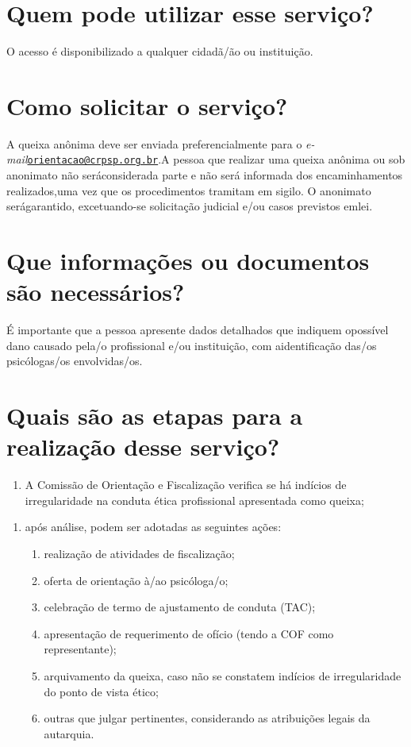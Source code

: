 \section{Quem pode utilizar esse serviço?}

O acesso é disponibilizado a qualquer cidadã/ão ou instituição.

\section{Como solicitar o serviço?}

A queixa anônima deve ser enviada preferencialmente para o \emph{e-mail}\href{mailto:orientacao@crpsp.org.br}{\nolinkurl{orientacao@crpsp.org.br}}.A pessoa que realizar uma queixa anônima ou sob anonimato não seráconsiderada parte e não será informada dos encaminhamentos realizados,uma vez que os procedimentos tramitam em sigilo. O anonimato serágarantido, excetuando-se solicitação judicial e/ou casos previstos emlei.

\section{Que informações ou documentos são necessários?}

É importante que a pessoa apresente dados detalhados que indiquem opossível dano causado pela/o profissional e/ou instituição, com aidentificação das/os psicólogas/os envolvidas/os.

\section{Quais são as etapas para a realização desse serviço?}

\begin{enumerate}
  \item  A Comissão de Orientação e Fiscalização verifica se há indícios de  irregularidade na conduta ética profissional apresentada como queixa;
\end{enumerate}

\begin{enumerate}
  \item  após análise, podem ser adotadas as seguintes ações:

        \begin{enumerate}
          \item    realização de atividades de fiscalização;
          \item    oferta de orientação à/ao psicóloga/o;
          \item    celebração de termo de ajustamento de conduta (TAC);
          \item    apresentação de requerimento de ofício (tendo a COF como    representante);
          \item    arquivamento da queixa, caso não se constatem indícios de    irregularidade do ponto de vista ético;
          \item    outras que julgar pertinentes, considerando as atribuições legais da    autarquia.
        \end{enumerate}
\end{enumerate}

